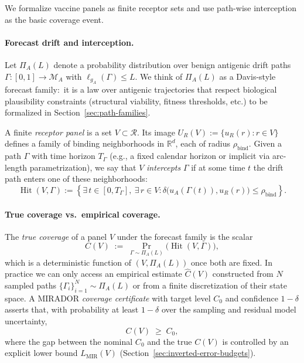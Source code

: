 \documentclass[11pt]{article}
\newcommand{\Rcal}{\mathcal{R}}
\newcommand{\M}{\mathcal{M}}
\newcommand{\Hit}{\operatorname{Hit}}
\begin{document}
We formalize vaccine panels as finite receptor sets and use path-wise interception as the basic
coverage event.

\paragraph{Forecast drift and interception.}
Let $\Pi_A(L)$ denote a probability distribution over benign antigenic drift paths
$\Gamma : [0,1]\to \M_A$ with $\ell_{g_A}(\Gamma)\le L$. We think of $\Pi_A(L)$ as a Davis-style
forecast family:\ it is a law over antigenic trajectories that respect biological plausibility constraints
(structural viability, fitness thresholds, etc.) to be formalized in Section~\ref{sec:path-families}.

A finite \emph{receptor panel} is a set $V \subset \Rcal$. Its image
$U_R(V) := \{u_R(r) : r \in V\}$ defines a family of binding neighborhoods in $\mathbb{R}^d$,
each of radius $\rho_{\text{bind}}$. Given a path $\Gamma$ with time horizon $T_\Gamma$ (e.g., a fixed
calendar horizon or implicit via arc-length parametrization), we say that $V$ \emph{intercepts}
$\Gamma$ if at some time $t$ the drift path enters one of these neighborhoods:
\[
\Hit(V,\Gamma)
:= \left\{\exists\, t \in [0, T_\Gamma],\ \exists\, r \in V :
\delta\bigl(u_A(\Gamma(t)), u_R(r)\bigr) \le \rho_{\text{bind}}\right\}.
\]

\paragraph{True coverage vs.\ empirical coverage.}
The \emph{true coverage} of a panel $V$ under the forecast family is the scalar
\[
C(V)
\;:=\;
\Pr_{\Gamma \sim \Pi_A(L)}\!\bigl(\Hit(V,\Gamma)\bigr),
\]
which is a deterministic function of $(V,\Pi_A(L))$ once both are fixed. In practice we can only
access an empirical estimate $\widehat{C}(V)$ constructed from $N$ sampled paths
$\{\Gamma_i\}_{i=1}^N \sim \Pi_A(L)$ or from a finite discretization of their state space. A MIRADOR
\emph{coverage certificate} with target level $C_0$ and confidence $1-\delta$ asserts that, with
probability at least $1-\delta$ over the sampling and residual model uncertainty,
\[
C(V) \;\ge\; C_0,
\]
where the gap between the nominal $C_0$ and the true $C(V)$ is controlled by an explicit lower
bound $L_{\text{MIR}}(V)$ (Section~\ref{sec:inverted-error-budgets}).
\end{document}
